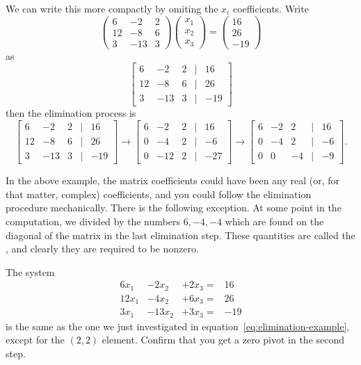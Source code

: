 We can write this more compactly by omiting the $x_i$ coefficients. Write
\[ 
\begin{pmatrix}
  6&-2&2\\ 12&-8&6\\ 3&-13&3
\end{pmatrix}
\begin{pmatrix} x_1\\ x_2\\ x_3 \end{pmatrix}
=
\begin{pmatrix}
  16\\ 26\\ -19
\end{pmatrix}
\]
as
\begin{equation}
\left[
  \begin{matrix}
    6&-2&2&|&16\\ 12&-8&6&|&26\\ 3&-13&3&|&-19      
  \end{matrix}\right]
\label{eq:systemabbrev}
\end{equation}
then the elimination process is
\[
\left[
  \begin{matrix}
    6&-2&2&|&16\\ 12&-8&6&|&26\\ 3&-13&3&|&-19      
  \end{matrix}\right] \longrightarrow
\left[
    \begin{matrix}
      6&-2&2&|&16\\ 0&-4&2&|&-6\\ 0&-12&2&|&-27
    \end{matrix}\right] \longrightarrow
  \left[
    \begin{matrix}
      6&-2&2&|&16\\ 0&-4&2&|&-6\\ 0&0&-4&|&-9
    \end{matrix}\right].
\]

In the above example, the matrix coefficients could have been any real
(or, for that matter, complex) coefficients, and you could follow the
elimination procedure mechanically.
There is  the following exception.
At some point in the computation, we divided by the numbers
$6,-4,-4$ which are found on the diagonal of the matrix in the last
elimination step. These quantities are called the ,
and clearly they are required to be nonzero. 

\begin{exercise}
  \label{ex:zero-pivot}
  The system 
  \[
  \begin{array}{rrrr}
    6x_1&-2x_2&+2x_3=&16 \\ 12x_1&-4x_2&+6x_3=&26 \\ 3x_1&-13x_2&+3x_3=&-19
  \end{array}
  \]
  is the same as the one we just investigated in
  equation~\eqref{eq:elimination-example}, except for the $(2,2)$
  element. Confirm that you get a zero pivot in the second step.
\end{exercise}


